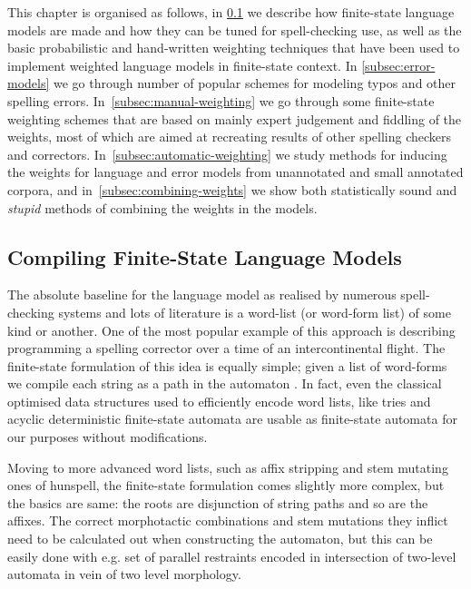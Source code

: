 \documentclass[a4paper,12pt]{article}
\begin{document}
This chapter is organised as follows, in \ref{subsec:language-models} we
describe how finite-state language models are made and how they can be tuned
for spell-checking use, as well as the basic probabilistic and hand-written
weighting techniques that have been used to implement weighted language models
in finite-state context. In \ref{subsec:error-models} we go through number of
popular schemes for modeling typos and other spelling errors. 
In~\ref{subsec:manual-weighting} we go through some finite-state weighting
schemes that are based on mainly expert judgement and fiddling of the weights,
most of which are aimed at recreating results of other spelling checkers and
correctors. In~\ref{subsec:automatic-weighting} we study methods for
inducing the weights for language and error models from unannotated and
small annotated corpora, and in~\ref{subsec:combining-weights} we show both
statistically sound and \emph{stupid} methods of combining the weights in the
models.

\subsection{Compiling Finite-State Language Models}
\label{subsec:language-models}

The absolute baseline for the language model as realised by numerous
spell-checking systems and lots of literature is a word-list (or word-form
list) of some kind or another. One of the most popular example of this approach
is \cite[]{norvig/2010} describing programming a spelling corrector over a time
of an intercontinental flight. The finite-state formulation of this idea is
equally simple; given a list of word-forms we compile each string as a path in
the automaton \cite[]{pirinen2012effects}. In fact, even the classical
optimised data structures used to efficiently encode word lists, like tries and
acyclic deterministic finite-state automata are usable as finite-state automata
for our purposes without modifications.

Moving to more advanced word lists, such as affix stripping and stem mutating
ones of hunspell, the finite-state formulation comes slightly more complex, but
the basics are same: the roots are disjunction of string paths and so are the
affixes. The correct morphotactic combinations and stem mutations they inflict
need to be calculated out when constructing the automaton, but this can be
easily done with e.g. set of parallel restraints encoded in intersection of
two-level automata \cite[]{pirinen2010creating} in vein of two level
morphology.
\end{document}
